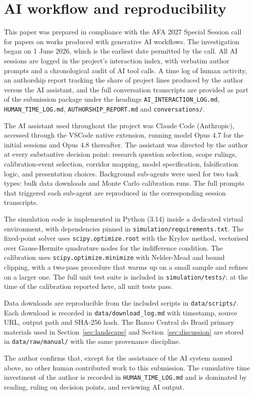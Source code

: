 \section{AI workflow and reproducibility}\label{app:ai_workflow}

This paper was prepared in compliance with the AFA 2027 Special Session call for papers on works produced with generative AI workflows. The investigation began on 1 June 2026, which is the earliest date permitted by the call. All AI sessions are logged in the project's interaction index, with verbatim author prompts and a chronological audit of AI tool calls. A time log of human activity, an authorship report tracking the share of project lines produced by the author versus the AI assistant, and the full conversation transcripts are provided as part of the submission package under the headings \texttt{AI\_INTERACTION\_LOG.md}, \texttt{HUMAN\_TIME\_LOG.md}, \texttt{AUTHORSHIP\_REPORT.md} and \texttt{conversations/}.

The AI assistant used throughout the project was Claude Code (Anthropic), accessed through the VSCode native extension, running model Opus 4.7 for the initial sessions and Opus 4.8 thereafter. The assistant was directed by the author at every substantive decision point: research question selection, scope rulings, calibration-event selection, corridor mapping, model specification, falsification logic, and presentation choices. Background sub-agents were used for two task types: bulk data downloads and Monte Carlo calibration runs. The full prompts that triggered each sub-agent are reproduced in the corresponding session transcripts.

The simulation code is implemented in Python (3.14) inside a dedicated virtual environment, with dependencies pinned in \texttt{simulation/requirements.txt}. The fixed-point solver uses \texttt{scipy.optimize.root} with the Krylov method, vectorised over Gauss-Hermite quadrature nodes for the indifference condition. The calibration uses \texttt{scipy.optimize.minimize} with Nelder-Mead and bound clipping, with a two-pass procedure that warms up on a small sample and refines on a larger one. The full unit test suite is included in \texttt{simulation/tests/}; at the time of the calibration reported here, all unit tests pass.

Data downloads are reproducible from the included scripts in \texttt{data/scripts/}. Each download is recorded in \texttt{data/download\_log.md} with timestamp, source URL, output path and SHA-256 hash. The Banco Central do Brasil primary materials used in Section~\ref{sec:landscape} and Section~\ref{sec:discussion} are stored in \texttt{data/raw/manual/} with the same provenance discipline.

The author confirms that, except for the assistance of the AI system named above, no other human contributed work to this submission. The cumulative time investment of the author is recorded in \texttt{HUMAN\_TIME\_LOG.md} and is dominated by reading, ruling on decision points, and reviewing AI output.
